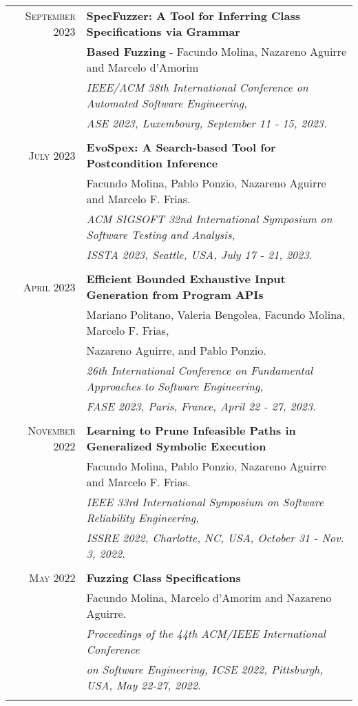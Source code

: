 \documentclass[a4paper,10pt]{article} %
\begin{document}
\begin{longtable}{rl}
\textsc{September} 2023  & \textbf{SpecFuzzer: A Tool for Inferring Class Specifications via Grammar} \\
        & \textbf{Based Fuzzing} - Facundo Molina, Nazareno Aguirre and Marcelo d'Amorim \\
        & \textit{IEEE/ACM 38th International Conference on Automated Software Engineering,} \\
        & \textit{ASE 2023, Luxembourg, September 11 - 15, 2023.} \\ & \\

\textsc{July} 2023  & \textbf{EvoSpex: A Search-based Tool for Postcondition Inference} \\
& Facundo Molina, Pablo Ponzio, Nazareno Aguirre and Marcelo F. Frias. \\
& \textit{ACM SIGSOFT 32nd International Symposium on Software Testing and Analysis,} \\
& \textit{ISSTA 2023, Seattle, USA, July 17 - 21, 2023.} \\ & \\

\textsc{April} 2023  & \textbf{Efficient Bounded Exhaustive Input Generation from Program APIs} \\
        & Mariano Politano, Valeria Bengolea, Facundo Molina, Marcelo F. Frias,\\
        & Nazareno Aguirre, and Pablo Ponzio. \\
	& \textit{26th International Conference on Fundamental Approaches to Software Engineering,} \\
        & \textit{FASE 2023, Paris, France, April 22 - 27, 2023.} \\ & \\

\textsc{November} 2022  & \textbf{Learning to Prune Infeasible Paths in Generalized Symbolic Execution} \\
        & Facundo Molina, Pablo Ponzio, Nazareno Aguirre and Marcelo F. Frias.\\
        & \textit{IEEE 33rd International Symposium on Software Reliability Engineering,} \\
        & \textit{ISSRE 2022, Charlotte, NC, USA, October 31 - Nov. 3, 2022.} \\ & \\

\textsc{May} 2022  & \textbf{Fuzzing Class Specifications} \\
	& Facundo Molina, Marcelo d'Amorim and Nazareno Aguirre. \\
	& \textit{Proceedings of the 44th ACM/IEEE International Conference} \\
	& \textit{on Software Engineering, ICSE 2022, Pittsburgh, USA, May 22-27, 2022.} \\ & \\


\end{longtable}
\end{document}
